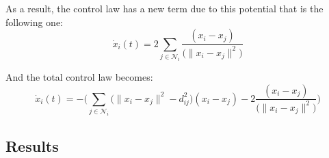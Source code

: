 \documentclass[a4paper,11pt,oneside]{book}
\begin{document}
As a result, the control law has a new term due to this potential that is the following one:
\begin{equation}
\dot{x}_i(t) = 2\sum_{j \in \mathcal{N}_i} \frac{(x_i-x_j)}{\big( \lVert x_i - x_j \rVert^2 \big)}
\end{equation}

And the total control law becomes:
\begin{equation}
\dot{x}_i(t) = - \Biggl( \sum_{j \in \mathcal{N}_i} \bigg( \lVert x_i - x_j \rVert^2 - d_{ij}^2 \bigg) (x_i - x_j ) - 2  \frac{(x_i-x_j)}{\big( \lVert x_i - x_j \rVert^2 \big)} \Biggr)
\label{Dynamics_with_collision_avoidance}
\end{equation}

\subsection{Results}
\end{document}
